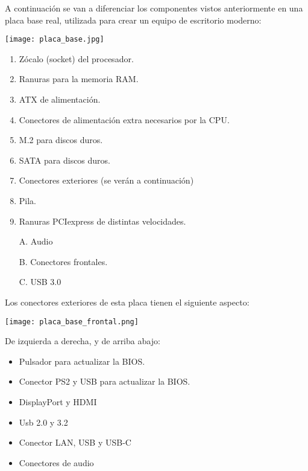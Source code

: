 A continuación se van a diferenciar los componentes vistos anteriormente en una placa base real, utilizada para crear un equipo de escritorio moderno:

\begin{center}
    \texttt{[image: placa\_base.jpg]}
\end{center}

\begin{enumerate}
    \item Zócalo (socket) del procesador.
    \item Ranuras para la memoria RAM.
    \item ATX de alimentación.
    \item Conectores de alimentación extra necesarios por la CPU.
    \item M.2 para discos duros.
    \item SATA para discos duros.
    \item Conectores exteriores (se verán a continuación)
    \item Pila.
    \item Ranuras PCIexpress de distintas velocidades.
    \item[A.] Audio
    \item[B.] Conectores frontales.
    \item[C.] USB 3.0
\end{enumerate}

Los conectores exteriores de esta placa tienen el siguiente aspecto:
\begin{center}
    \texttt{[image: placa\_base\_frontal.png]}
\end{center}

De izquierda a derecha, y de arriba abajo:
\begin{itemize}
    \item Pulsador para actualizar la BIOS.
    \item Conector PS2 y USB para actualizar la BIOS.
    \item DisplayPort y HDMI
    \item Usb 2.0 y 3.2
    \item Conector LAN, USB y USB-C
    \item Conectores de audio
\end{itemize}


